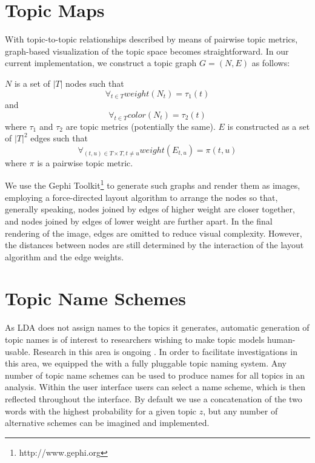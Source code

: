 \documentclass[11pt]{article}
\begin{document}
\section{Topic Maps}\label{sec:maps}
With topic-to-topic relationships described by means of pairwise topic metrics,
graph-based visualization of the topic space becomes straightforward. In our
current implementation, we construct a topic graph $G = (N, E)$ as follows:

$N$ is a set of $|T|$ nodes such that
\[\forall_{t\in T} weight(N_{t}) = \tau_{1}(t)\]
and
\[\forall_{t\in T} color(N_{t}) = \tau_{2}(t)\]
where $\tau_1$ and $\tau_2$ are topic metrics (potentially the same). $E$ is
constructed as a set of $|T|^2$ edges such that
  \[\forall_{(t,u)\in T\times T, t\neq u} weight(E_{t,u}) = \pi(t,u)\]
where $\pi$ is a pairwise topic metric.

We use the Gephi Toolkit\footnote{http://www.gephi.org} to generate such graphs
and render them as images, employing a force-directed layout algorithm to
arrange the nodes so that, generally speaking, nodes joined by edges of higher
weight are closer together, and nodes joined by edges of lower weight are
further apart. In the final rendering of the image, edges are omitted to reduce
visual complexity. However, the distances between nodes are still determined by
the interaction of the layout algorithm and the edge weights. 


\section{Topic Name Schemes}
As LDA does not assign names to the topics it generates, automatic generation of
topic names is of interest to researchers wishing to make topic models
human-usable. Research in this area is ongoing \cite{Mei2007,Lau2010}. In order to
facilitate investigations in this area, we equipped the \tool{} with a
fully pluggable topic naming system. Any number of topic name schemes can be
used to produce names for all topics in an analysis. Within the user interface
users can select a name scheme, which is then reflected throughout the
interface. By default we use a concatenation of the two
words with the highest probability for a given topic $z$, but any number of
alternative schemes can be imagined and implemented.%
\end{document}
